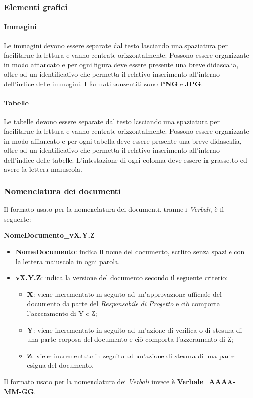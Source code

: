 \subsubsection{Elementi grafici}
\paragraph{Immagini} \Spazio
Le immagini devono essere separate dal testo lasciando una spaziatura per facilitarne la lettura e vanno centrate orizzontalmente. Possono essere organizzate in modo affiancato e per ogni figura deve essere presente una breve didascalia, oltre ad un identificativo che permetta il relativo inserimento all’interno dell’indice delle
immagini. I formati consentiti sono \textbf{PNG} e \textbf{JPG}.
\paragraph{Tabelle} \Spazio
Le tabelle devono essere separate dal testo lasciando una spaziatura per facilitarne la lettura e vanno centrate orizzontalmente. Possono essere organizzate in modo affiancato e per ogni tabella deve essere presente una breve didascalia, oltre ad un identificativo che permetta il relativo inserimento all’interno dell’indice delle
tabelle. L'intestazione di ogni colonna deve essere in grassetto ed avere la lettera maiuscola.


\subsubsection{Nomenclatura dei documenti}
Il formato usato per la nomenclatura dei documenti, tranne i \emph{Verbali}, è il seguente: \Spazio \centerline{\textbf{NomeDocumento\_vX.Y.Z}}
\begin{itemize}
	\item \textbf{NomeDocumento}: indica il nome del documento, scritto senza spazi e con la lettera maiuscola in ogni parola.
	\item \textbf{vX.Y.Z}: indica la versione del documento secondo il seguente criterio:
	\begin{itemize}
		\item \textbf{X}: viene incrementato in seguito ad un'approvazione ufficiale del documento da parte del \emph{Responsabile di Progetto} e ciò comporta l'azzeramento di Y e Z;
		\item \textbf{Y}: viene incrementato in seguito ad un'azione di verifica o di stesura di una parte corposa del documento e ciò comporta l'azzeramento di Z;
		\item \textbf{Z}: viene incrementato in seguito ad un'azione di stesura di una parte esigua del documento.
	\end{itemize}
\end{itemize}
Il formato usato per la nomenclatura dei \emph{Verbali} invece è \textbf{Verbale\_AAAA-MM-GG}.

